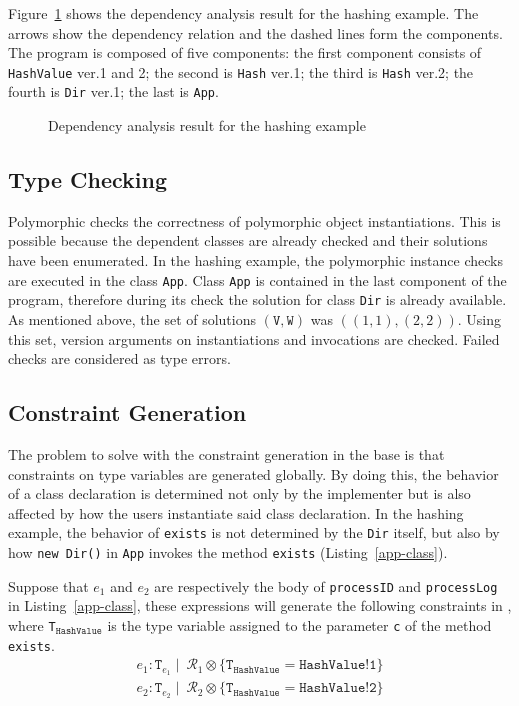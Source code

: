 Figure~\ref{component-hashing} shows the dependency analysis result for the hashing example. 
The arrows show the dependency relation and the dashed lines form the components. 
The program is composed of five components: the first component consists of \texttt{HashValue} 
ver.1 and 2; the second is \texttt{Hash} ver.1; the third is \texttt{Hash} ver.2; the fourth is \texttt{Dir} ver.1; 
the last is \texttt{App}.

\begin{figure}[t]
\center
\caption{Dependency analysis result for the hashing example}
\label{component-hashing}
\end{figure}

\subsection{Type Checking}

Polymorphic \lang{} checks the correctness of polymorphic object instantiations. 
This is possible because the dependent classes are already checked and their solutions have been enumerated.
In the hashing example, the polymorphic instance checks are executed in the class \texttt{App}. 
Class \texttt{App} is contained in the last component of the program, therefore during its check the solution 
for class \texttt{Dir} is already available. As mentioned above, the set of solutions $(\texttt{V},\texttt{W})$ was $((1,1),(2,2))$.
Using this set, version arguments on instantiations and invocations are checked. 
Failed checks are considered as type errors.

\subsection{Constraint Generation}

The problem to solve with the constraint generation in the base \lang{} is that 
constraints on type variables are generated globally.
By doing this, the behavior of a class declaration is determined not only by the implementer but
is also affected by how the users instantiate said class declaration.
In the hashing example, the behavior of \texttt{exists} is not determined by the \texttt{Dir} itself, 
but also by how \texttt{new Dir()} in \texttt{App} invokes the method \texttt{exists} (Listing~\ref{app-class}).

Suppose that $e_{1}$ and $e_{2}$ are respectively the body of \texttt{processID} and \texttt{processLog} in 
Listing~\ref{app-class}, these expressions will generate the following constraints in \lang{}, where 
\texttt{T}$_{\texttt{HashValue}}$ is the type variable assigned to the parameter \texttt{c} of the method \texttt{exists}.
\begin{align*}
e_{1} : \texttt{T}_{e_{1}} \mid \: \mathcal{R}_{1} \otimes \{ \texttt{T}_{\texttt{HashValue}} = \texttt{HashValue!1} \} \\
e_{2} : \texttt{T}_{e_{2}} \mid \: \mathcal{R}_{2} \otimes \{ \texttt{T}_{\texttt{HashValue}} = \texttt{HashValue!2} \}
\end{align*}

